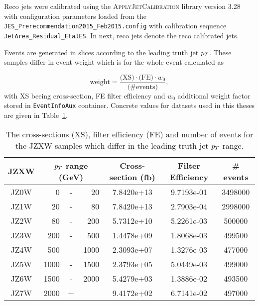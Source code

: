 Reco jets were calibrated using the \textsc{ApplyJetCalibration}
\cite{ApplyJetCalibration} library version 3.28 with configuration parameters
loaded from the \texttt{JES\_Prerecommendation2015\_Feb2015.config} with
calibration sequence \texttt{JetArea\_Residual\_EtaJES}. In next, reco jets
denote the reco calibrated jets.

Events are generated in slices according to the leading truth jet $p_{T}$. These
samples differ in event weight which is for the whole event calculated as 

\begin{equation}
  \text{weight} = \frac{\text{(XS)} \cdot \text{(FE)} \cdot w_0}{\text{(\# events)}},
\end{equation}
with XS beeing cross-section, FE filter efficiency and $w_0$ additional weight
factor stored in \texttt{EventInfoAux} container. Concrete values for datasets used in
this theses are given in Table~\ref{tab:JZXW}.  

\begin{table}
  \centering
  \begin{tabular}{|c|rcr|c|c|c|}
    \hline 
     JZXW & \multicolumn{3}{|c|}{$p_{T}$ range (GeV)} & Cross-section (fb) & Filter Efficiency & \# events  \\ 
    \hline
    \hline
		 JZ0W &     0 & - &    20 & 7.8420e+13 & 9.7193e-01 & 3498000 \\ 
    \hline
		 JZ1W &    20 & - &    80 & 7.8420e+13 & 2.7903e-04 & 2998000 \\
    \hline
		 JZ2W &    80 & - &   200 & 5.7312e+10 & 5.2261e-03 & 500000  \\
    \hline
		 JZ3W &   200 & - &   500 & 1.4478e+09 & 1.8068e-03 & 499500  \\
    \hline
		 JZ4W &   500 & - &  1000 & 2.3093e+07 & 1.3276e-03 & 477000  \\
    \hline
		 JZ5W &  1000 & - &  1500 & 2.3793e+05 & 5.0449e-03 & 499000  \\
    \hline
		 JZ6W &  1500 & - &  2000 & 5.4279e+03 & 1.3886e-02 & 493500  \\
    \hline
		 JZ7W &  2000 & + &       & 9.4172e+02 & 6.7141e-02 & 497000  \\
    \hline 
  \end{tabular}
  \caption{The cross-sections (XS), filter efficiency (FE) and number of events
  for the JZXW samples which differ in the leading truth jet $p_{T}$ range.}
  \label{tab:JZXW}
\end{table}

